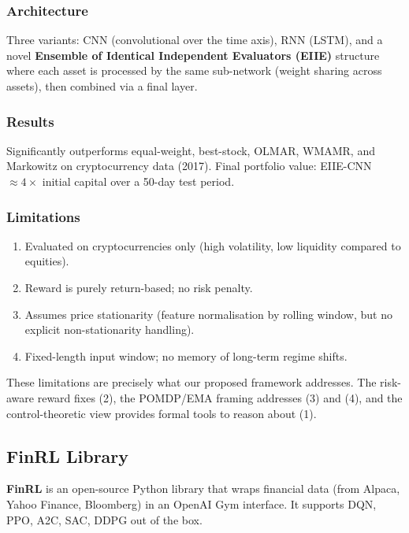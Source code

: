 \documentclass[12pt,a4paper]{article}
\begin{document}
\subsubsection*{Architecture}

Three variants: CNN (convolutional over the time axis), RNN (LSTM), and a
novel \textbf{Ensemble of Identical Independent Evaluators (EIIE)} structure
where each asset is processed by the same sub-network (weight sharing across
assets), then combined via a final layer.

\subsubsection*{Results}

Significantly outperforms equal-weight, best-stock, OLMAR, WMAMR, and
Markowitz on cryptocurrency data (2017).
Final portfolio value: EIIE-CNN $\approx 4\times$ initial capital over a
50-day test period.

\subsubsection*{Limitations}

\begin{enumerate}[nosep]
  \item Evaluated on cryptocurrencies only (high volatility, low liquidity
        compared to equities).
  \item Reward is purely return-based; no risk penalty.
  \item Assumes price stationarity (feature normalisation by rolling window,
        but no explicit non-stationarity handling).
  \item Fixed-length input window; no memory of long-term regime shifts.
\end{enumerate}

\begin{finbox}
These limitations are precisely what our proposed framework addresses.
The risk-aware reward fixes (2), the POMDP/EMA framing addresses (3) and (4),
and the control-theoretic view provides formal tools to reason about (1).
\end{finbox}

\subsection{FinRL Library}

\textbf{FinRL} \cite{liu2021finrl} is an open-source Python library that
wraps financial data (from Alpaca, Yahoo Finance, Bloomberg) in an
OpenAI Gym interface.  It supports DQN, PPO, A2C, SAC, DDPG out of the box.
\end{document}
